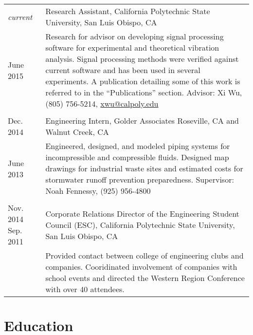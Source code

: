 \documentclass[10pt]{article} %
\begin{document}
	\begin{tabular}{p{.65in}|p{5.5in}}
		\emph{current} & Research Assistant, California Polytechnic State University, San Luis Obispo, CA \\
		June 2015 & \footnotesize{Research for advisor on developing signal processing software for experimental and theoretical vibration analysis. Signal processing methods were verified against current software and has been used in several experiments. A publication detailing some of this work is referred to in the ``Publications'' section. Advisor: Xi Wu, (805) 756-5214}, \href{mailto:xwu@calpoly.edu}{xwu@calpoly.edu}\\
		\multicolumn{2}{c}{} \\		
		
		Dec. 2014 & Engineering Intern, Golder Associates Roseville, CA and Walnut Creek, CA \\
		June 2013 &\footnotesize{Engineered, designed, and modeled piping systems for incompressible and compressible fluids. Designed map drawings for industrial waste sites and estimated costs for stormwater runoff prevention preparedness. Supervisor: Noah Fennessy, (925) 956-4800}\\
		\multicolumn{2}{c}{} \\		
		
		Nov. 2014 Sep. 2011& Corporate Relations Director of the Engineering Student Council (ESC), California Polytechnic State University, San Luis Obispo, CA\\
		& \footnotesize{Provided contact between college of engineering clubs and companies. Cooridinated involvement of companies with school events and directed the Western Region Conference with over 40 attendees.}\\
	\end{tabular}


\section{Education}
\end{document}
